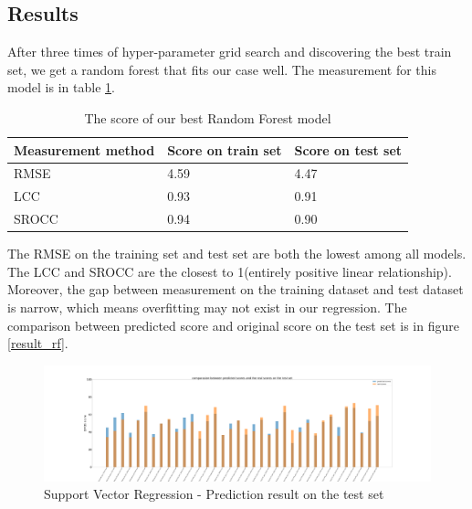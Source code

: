 \documentclass[10pt,conference,compsocconf]{IEEEtran}
\begin{document}
\subsection{Results}
After three times of hyper-parameter grid search and discovering the best train set, we get a random forest that fits our case well. The measurement for this model is in table \ref{best_rf}.
\begin{table}[h]
  \centering
  \begin{tabular}[c]{|l||l|l|}
    \hline
    Measurement method & Score on train set & Score on test set\\
    \hline
    RMSE & 4.59 & 4.47 \\
    LCC & 0.93 & 0.91 \\
    SROCC & 0.94 & 0.90  \\
    \hline
  \end{tabular}
  \caption{The score of our best Random Forest model}
  \label{best_rf}
\end{table}
The RMSE on the training set and test set are both the lowest among all models. The LCC and SROCC are the closest to 1(entirely positive linear relationship). Moreover, the gap between measurement on the training dataset and test dataset is narrow, which means overfitting may not exist in our regression. The comparison between predicted score and original score on the test set is in figure \ref{result_rf}.


\begin{figure}[htbp]
\centering
\includegraphics[width = \linewidth]{comparasion_predit_real.pdf}
\caption{Support Vector Regression - Prediction result on the test set}
\label{result_svr}
\end{figure}
\end{document}
